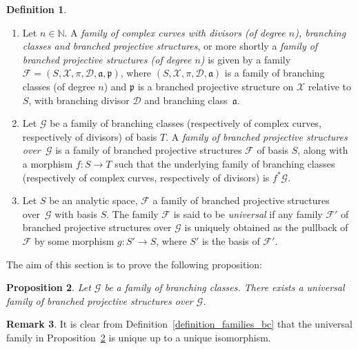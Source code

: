 \documentclass[JEP,XML,SOM,Unicode,NoEqCountersInSection,published]{cedram}
\newcommand{\N}{\mathbb N}
\theoremstyle{definition}
\newtheorem{definition}{Definition}[subsection]
\newtheorem{remark}[definition]{Remark}
\theoremstyle{plain}
\newtheorem{proposition}[definition]{Proposition}
\begin{document}
\skpt
\begin{definition}\label{definition_families_bps}
\begin{enumerate}
\item
Let $n \in \N$.
A \emph{family of complex curves with divisors (of degree $n$), branching classes and branched projective structures}, or more shortly a \emph{family of branched projective structures (of degree $n$)} is given by a family $\mathcal F = (S, \mathcal X, \pi, \mathcal D, \mathfrak a, \mathfrak p)$, where $(S, \mathcal X, \pi, \mathcal D, \mathfrak a)$ is a family of branching classes (of degree $n$) and $\mathfrak p$ is a branched projective structure on $\mathcal X$ relative to $S$, with branching divisor $\mathcal D$ and branching class~$\mathfrak a$.
\item
Let $\mathcal G$ be a family of branching classes (respectively of complex curves, respectively of divisors) of basis $T$.
A \emph{family of branched projective structures over~$\mathcal G$} is a family of branched projective structures $\mathcal F$ of basis $S$, along with a morphism $f: S \to T$ such that the underlying family of branching classes (respectively of complex curves, respectively of divisors) is $f^*\mathcal G$.
\item
Let $S$ be an analytic space, $\mathcal F$ a family of branched projective structures over~$\mathcal G$ with basis $S$.
The family $\mathcal F$ is said to be \emph{universal} if any family $\mathcal F'$ of branched projective structures over $\mathcal G$ is uniquely obtained as the pullback of $\mathcal F$ by some morphism $g: S' \to S$, where $S'$ is the basis of $\mathcal F'$.
\end{enumerate}
\end{definition}

The aim of this section is to prove the following proposition:

\begin{proposition}\label{proposition_universal_family_bps_over_bc}
Let $\mathcal G$ be a family of branching classes. There exists a universal family of branched projective structures over $\mathcal G$.
\end{proposition}

\begin{remark}
It is clear from Definition~\ref{definition_families_bc} that the universal family in Proposition~\ref{proposition_universal_family_bps_over_bc} is unique up to a unique isomorphism.
\end{remark}
\end{document}
